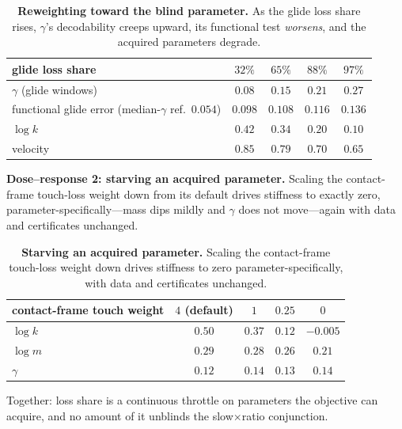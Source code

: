 \documentclass{article} %
\begin{document}
\begin{table}[H]
\caption{\textbf{Reweighting toward the blind parameter.} As the glide loss share rises, $\gamma$'s decodability creeps upward, its functional test \emph{worsens}, and the acquired parameters degrade.}
\label{tab:dose1}
\begin{center}
\small
\begin{tabular}{lcccc}
\toprule
\rowcolor{tabhead} glide loss share & $32\%$ & $65\%$ & $88\%$ & $97\%$ \\
\midrule
$\gamma$ (glide windows) & $0.08$ & $0.15$ & $0.21$ & $0.27$ \\
functional glide error (median-$\gamma$ ref.\ $0.054$) & $0.098$ & $0.108$ & $0.116$ & $0.136$ \\
$\log k$ & $0.42$ & $0.34$ & $0.20$ & $0.10$ \\
velocity & $0.85$ & $0.79$ & $0.70$ & $0.65$ \\
\bottomrule
\end{tabular}
\end{center}
\end{table}

\textbf{Dose--response 2: starving an acquired parameter.} Scaling the
contact-frame touch-loss weight down from its default drives stiffness to
exactly zero, parameter-specifically---mass dips mildly and $\gamma$ does
not move---again with data and certificates unchanged.

\begin{table}[H]
\caption{\textbf{Starving an acquired parameter.} Scaling the contact-frame touch-loss weight down drives stiffness to zero parameter-specifically, with data and certificates unchanged.}
\label{tab:dose2}
\begin{center}
\small
\begin{tabular}{lcccc}
\toprule
\rowcolor{tabhead} contact-frame touch weight & $4$ (default) & $1$ & $0.25$ & $0$ \\
\midrule
$\log k$ & $0.50$ & $0.37$ & $0.12$ & $-0.005$ \\
$\log m$ & $0.29$ & $0.28$ & $0.26$ & $0.21$ \\
$\gamma$ & $0.12$ & $0.14$ & $0.13$ & $0.14$ \\
\bottomrule
\end{tabular}
\end{center}
\end{table}

Together: loss share is a continuous throttle on parameters the objective
can acquire, and no amount of it unblinds the slow$\times$ratio conjunction.
\end{document}
